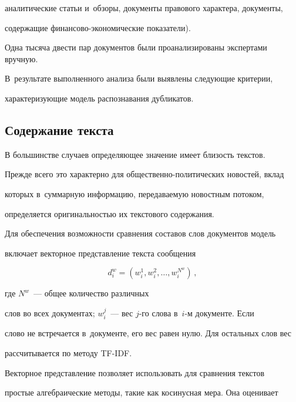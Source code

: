 аналитические статьи и~обзоры, документы правового характера, документы,

содержащие фи\-нан\-со\-во-эко\-но\-ми\-че\-ские показатели).



  Одна тысяча двести пар документов были проанализированы экспертами вручную.

В~результате выполненного анализа были выявлены следующие критерии,

характеризующие модель распознавания дубликатов.



  \vspace*{-2pt}



\subsection{Содержание текста}



  \vspace*{-2pt}



  В большинстве случаев определяющее значение имеет близость текстов.

Преж\-де всего это характерно для общественно-политических новостей, вклад

которых в~суммарную информацию, передаваемую новостным потоком,

определяется оригинальностью их текстового содержания.



  Для обеспечения возможности сравнения составов слов документов модель

включает векторное представление текста сообщения

$$

d_i^w= \left( w_i^1, w_i^2, \ldots , w_i^{N^w}\right)\,,

$$

 где $N^w$~--- общее количество различных

слов во всех документах; $w_i^j$~--- вес $j$-го слова в~$i$-м документе. Если

слово не встречается в~документе, его вес равен нулю. Для остальных слов вес

рассчитывается по методу TF-IDF.



  Векторное представление позволяет использовать для сравнения текстов

прос\-тые алгебраические методы, такие как косинусная мера. Она оценивает

